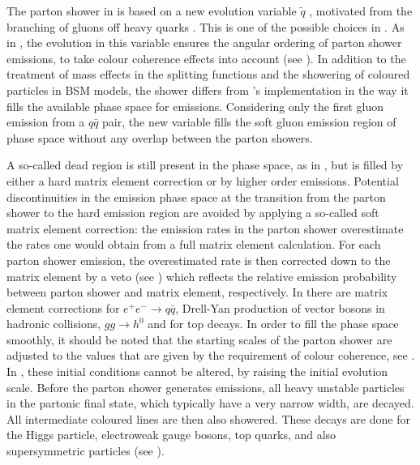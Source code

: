 The parton shower in \Herwigpp is based on a new evolution variable
$\tilde q$ \cite{Gieseke:2003rz}, motivated from the branching of gluons
off heavy quarks \cite{Catani:2002hc}.  This is one of the possible
choices in .  As in \Herwig, the evolution in this
variable ensures the angular ordering of parton shower emissions,
to take colour coherence effects into account 
(see ). In addition to the treatment
of mass effects in the splitting functions and the showering of
coloured particles in BSM models,
 the shower differs from \Herwig's implementation in the way it
 fills the
available phase space for emissions.  Considering only the first gluon
emission from a $q\bar q$ pair, the new
variable fills the soft gluon emission region of phase space 
without any overlap between the parton showers. 

A so-called dead region is still present in the phase space, as in
\Herwig, but is filled by either a hard matrix element correction or by
higher order emissions.  Potential discontinuities in the emission phase
space at the transition from the parton shower to the hard emission
region are avoided by applying a so-called soft matrix element
correction: the emission rates in the parton shower overestimate the
rates one would obtain from a full matrix element calculation. For each
parton shower emission, the overestimated rate is then corrected down to
the matrix element by a veto (see ) 
which reflects the relative emission
probability between parton shower and matrix element, respectively.  In
\Herwigpp there are matrix element corrections for $e^+e^-\to q\bar q$,
Drell-Yan production of vector bosons in hadronic collisions, $gg\to
h^0$ and for top decays.  In order to fill the phase space smoothly, it
should be noted that the starting scales of the parton shower are
adjusted to the values that are given by the requirement of
colour coherence, see
.  In \herwigpp, these
initial conditions cannot be
altered, \eg by raising the initial evolution scale. 
Before the parton shower generates emissions, all heavy unstable
particles in the partonic
final state, which typically have a very narrow width, are decayed.  
All intermediate coloured lines are then also showered.
These decays are done for the Higgs particle,
electroweak gauge bosons, top quarks, and also \eg
supersymmetric particles (see ). 


\mcsubsection{\gensectionMPI}
\label{sec:herwigmpi} 

